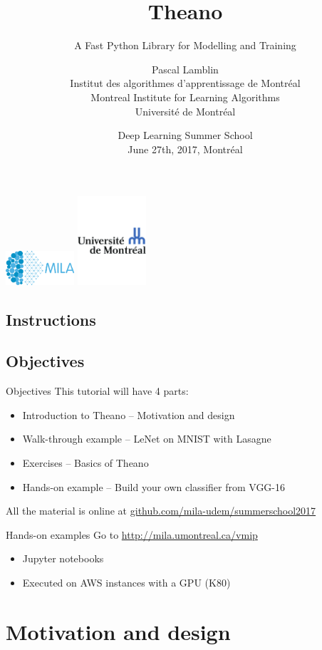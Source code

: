 \documentclass[a4paper,9pt]{beamer}
\title[Theano]{Theano}
\subtitle{A Fast Python Library for Modelling and Training}
\author[MILA]{%
Pascal Lamblin\\
Institut des algorithmes d'apprentissage de Montréal\\
Montreal Institute for Learning Algorithms\\
Université de Montréal}
\date{%
Deep Learning Summer School\\
June 27th, 2017, Montréal%
}
\begin{document}
\begin{frame}[plain]
  \titlepage
  \includegraphics[width=1in]{MILA_official_2016.png}
  \hfill
  \includegraphics[width=1in]{UdeM_logo.pdf}
\end{frame}


\subsection*{Instructions}

\subsection*{Objectives}
\begin{frame}[fragile]{Objectives}
  This tutorial will have 4 parts:
  \begin{itemize}
    \item Introduction to Theano -- Motivation and design
    \item Walk-through example -- LeNet on MNIST with Lasagne
    \item Exercises -- Basics of Theano
    \item Hands-on example -- Build your own classifier from VGG-16
  \end{itemize}

  All the material is online at \url{github.com/mila-udem/summerschool2017}

  \begin{block}{Hands-on examples}
  Go to \url{http://mila.umontreal.ca/vmip}
  \begin{itemize}
    \item Jupyter notebooks
    \item Executed on AWS instances with a GPU (K80)
  \end{itemize}
  \end{block}
\end{frame}


\section{Motivation and design}
\begin{frame}
  \tableofcontents[currentsection]
\end{frame}
\end{document}
